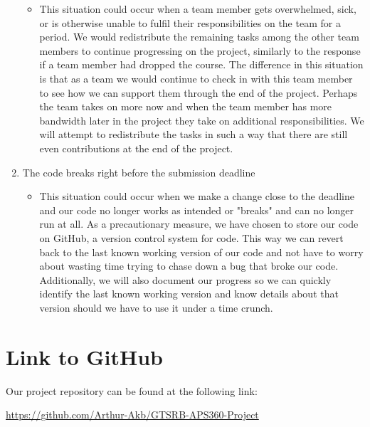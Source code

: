 \documentclass{article} %
\begin{document}
\begin{enumerate}
\begin{itemize}
\item This situation could occur when a team member gets overwhelmed, sick, or is otherwise unable to fulfil their responsibilities on the team for a period. We would redistribute the remaining tasks among the other team members to continue progressing on the project, similarly to the response if a team member had dropped the course. The difference in this situation is that as a team we would continue to check in with this team member to see how we can support them through the end of the project. Perhaps the team takes on more now and when the team member has more bandwidth later in the project they take on additional responsibilities. We will attempt to redistribute the tasks in such a way that there are still even contributions at the end of the project.
\end{itemize}
\item The code breaks right before the submission deadline \begin{itemize}
\item This situation could occur when we make a change close to the deadline and our code no longer works as intended or "breaks" and can no longer run at all. As a precautionary measure, we have chosen to store our code on GitHub, a version control system for code. This way we can revert back to the last known working version of our code and not have to worry about wasting time trying to chase down a bug that broke our code. Additionally, we will also document our progress so we can quickly identify the last known working version and know details about that version should we have to use it under a time crunch.
\end{itemize}
\end{enumerate}

\section{Link to GitHub}
Our project repository can be found at the following link:
\begin{center}
    \url{https://github.com/Arthur-Akb/GTSRB-APS360-Project}
\end{center}
\label{last_page}



\end{document}
